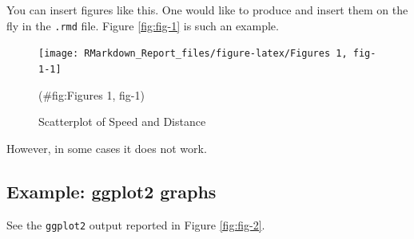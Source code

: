 \documentclass[
  12pt,
]{article}
\newenvironment{Shaded}{\begin{snugshade}}{\end{snugshade}}
\newcommand{\AttributeTok}[1]{\textcolor[rgb]{0.77,0.63,0.00}{#1}}
\newcommand{\CommentTok}[1]{\textcolor[rgb]{0.56,0.35,0.01}{\textit{#1}}}
\newcommand{\FunctionTok}[1]{\textcolor[rgb]{0.00,0.00,0.00}{#1}}
\newcommand{\NormalTok}[1]{#1}
\newcommand{\OtherTok}[1]{\textcolor[rgb]{0.56,0.35,0.01}{#1}}
\newcommand{\SpecialCharTok}[1]{\textcolor[rgb]{0.00,0.00,0.00}{#1}}
\newcommand{\StringTok}[1]{\textcolor[rgb]{0.31,0.60,0.02}{#1}}
\begin{document}
You can insert figures like this. One would like to produce and insert them on the fly in the \texttt{.rmd} file. Figure \ref{fig:fig-1} is such an example.

\begin{Shaded}
\end{Shaded}

\begin{figure}[H]

{\centering \texttt{[image: RMarkdown\_Report\_files/figure-latex/Figures 1, fig-1-1]} 

}

\caption{Scatterplot of Speed and Distance}(\#fig:Figures 1, fig-1)
\end{figure}

However, in some cases it does not work.

\hypertarget{example-ggplot2-graphs}{%
\subsection{Example: ggplot2 graphs}\label{example-ggplot2-graphs}}

See the \texttt{ggplot2} output reported in Figure \ref{fig:fig-2}.

\begin{Shaded}
\end{Shaded}
\end{document}
